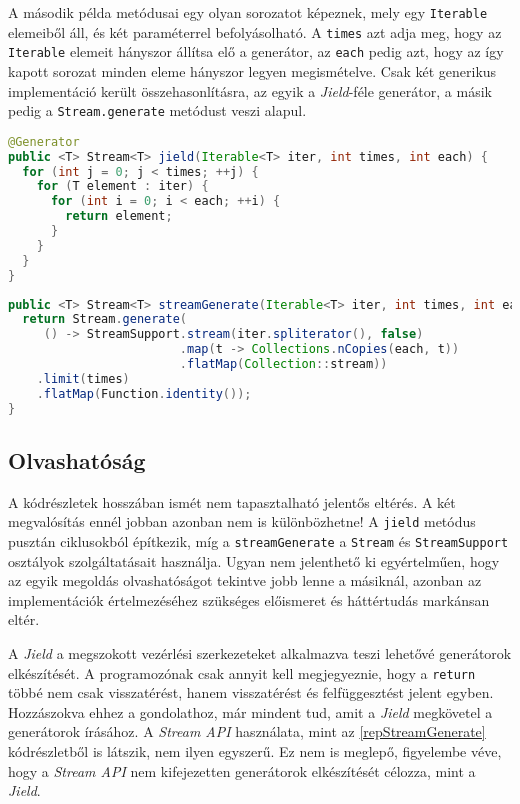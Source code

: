 A második példa metódusai egy olyan sorozatot képeznek, mely egy \texttt{Iterable} elemeiből áll, és két paraméterrel befolyásolható. A \texttt{times} azt adja meg, hogy az \texttt{Iterable} elemeit hányszor állítsa elő a generátor, az \texttt{each} pedig azt, hogy az így kapott sorozat minden eleme hányszor legyen megismételve. Csak két generikus implementáció került összehasonlításra, az egyik a \textit{Jield}-féle generátor, a másik pedig a \texttt{Stream.generate} metódust veszi alapul.

\begin{lstlisting}[language=Java, caption={Elemek ismétlése \textit{Jield} segítségével}, escapechar=!, captionpos=b, belowskip=1em, belowcaptionskip=0em]
@Generator
public <T> Stream<T> jield(Iterable<T> iter, int times, int each) {
  for (int j = 0; j < times; ++j) {
    for (T element : iter) {
      for (int i = 0; i < each; ++i) {
        return element;
      }
    }
  }
}
\end{lstlisting}

\begin{lstlisting}[language=Java, caption={Elemek ismétlése \texttt{Stream.generate} használatával}, escapechar=!, captionpos=b, aboveskip=1em, label=repStreamGenerate]
public <T> Stream<T> streamGenerate(Iterable<T> iter, int times, int each) {
  return Stream.generate(
     () -> StreamSupport.stream(iter.spliterator(), false)
                        .map(t -> Collections.nCopies(each, t))
                        .flatMap(Collection::stream))
    .limit(times)
    .flatMap(Function.identity());
}
\end{lstlisting} 

\subsection{Olvashatóság}

A kódrészletek hosszában ismét nem tapasztalható jelentős eltérés. A két megvalósítás ennél jobban azonban nem is különbözhetne! A \texttt{jield} metódus pusztán ciklusokból építkezik, míg a \texttt{streamGenerate} a \texttt{Stream} és \texttt{StreamSupport} osztályok szolgáltatásait használja. Ugyan nem jelenthető ki egyértelműen, hogy az egyik megoldás olvashatóságot tekintve jobb lenne a másiknál, azonban az implementációk értelmezéséhez szükséges előismeret és háttértudás markánsan eltér. 

A \textit{Jield} a megszokott vezérlési szerkezeteket alkalmazva teszi lehetővé generátorok elkészítését. A programozónak csak annyit kell megjegyeznie, hogy a \texttt{return} többé nem csak visszatérést, hanem visszatérést és felfüggesztést jelent egyben. Hozzászokva ehhez a gondolathoz, már mindent tud, amit a \textit{Jield} megkövetel a generátorok írásához. A \textit{Stream API} használata, mint az \ref{repStreamGenerate} kódrészletből is látszik, nem ilyen egyszerű. Ez nem is meglepő, figyelembe véve, hogy a \textit{Stream API} nem kifejezetten generátorok elkészítését célozza, mint a \textit{Jield}.

